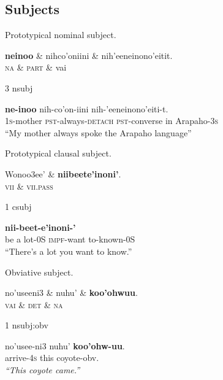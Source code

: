 \documentclass{handout}
\begin{document}
\maketitleinst

\begin{multicols}{2}

\section{Subjects}
\footnotesize
\begin{exe}
\ex \label{nsubj} Prototypical nominal subject.\\%
\begin{dependency}
\begin{deptext}
\textbf{neinoo} \& nihco'oniini \& nih'eeneinono'eitit.\\
\textsc{na} \& \textsc{part} \& {vai}\\
\end{deptext}
	{3}	{nsubj}
\end{dependency}
\gll \textbf{ne-inoo} nih-co'on-iini nih-'eeneinono'eiti-t.\\
{\textsc{1s}-mother} {\textsc{pst}-always-\textsc{detach}} {\textsc{pst}-converse in Arapaho-\textsc{3s}}\\
\trans ``My mother always spoke the Arapaho language''
\end{exe}
\begin{exe}
\ex \label{csubj} Prototypical clausal subject.\\%
\begin{dependency}
\begin{deptext}
Wonoo3ee' \& \textbf{niibeete'inoni'}.\\
\textsc{vii} \& \textsc{vii.pass}\\
\end{deptext}
	{1}	{csubj}
\end{dependency}
 \textbf{nii-beet-e'inoni-'}\\
{be a lot-0S} {\textsc{impf}-want to-known-0S}\\
\trans ``There's a lot you want to know.''
\end{exe}

\begin{exe}
\ex \label{nsubj:obv} Obviative subject.\\ %
\begin{dependency}
\begin{deptext}
no'useeni3 \& nuhu' \& \textbf{koo'ohwuu}.\\
\textsc{vai} \& \textsc{det} \& \textsc{na}\\
\end{deptext}
	{1}	{nsubj:obv}
\end{dependency}
\gll no'usee-ni3 nuhu' \textbf{koo'ohw-uu}.\\
{arrive-\textsc{4s}} this coyote-obv.\\
\trans \textit{``This coyote came.''}
\end{exe}
\normalsize

\end{multicols}
\end{document}
